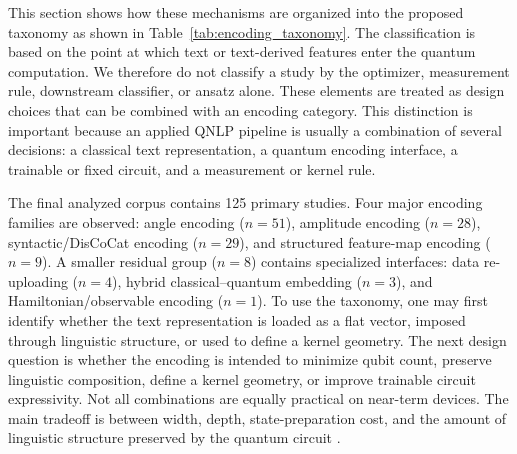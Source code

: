 \documentclass{ieeeaccess}
\begin{document}
This section shows how these mechanisms are organized into the proposed taxonomy as shown in Table~\ref{tab:encoding_taxonomy}. The classification is based on the point at which text or text-derived features enter the quantum computation. We therefore do not classify a study by the optimizer, measurement rule, downstream classifier, or ansatz alone. These elements are treated as design choices that can be combined with an encoding category. This distinction is important because an applied QNLP pipeline is usually a combination of several decisions: a classical text representation, a quantum encoding interface, a trainable or fixed circuit, and a measurement or kernel rule.

The final analyzed corpus contains 125 primary studies. Four major encoding families are observed: angle encoding ($n=51$), amplitude encoding ($n=28$), syntactic/DisCoCat encoding ($n=29$), and structured feature-map encoding ($n=9$). A smaller residual group ($n=8$) contains specialized interfaces: data re-uploading ($n=4$), hybrid classical--quantum embedding ($n=3$), and Hamiltonian/observable encoding ($n=1$). To use the taxonomy, one may first identify whether the text representation is loaded as a flat vector, imposed through linguistic structure, or used to define a kernel geometry. The next design question is whether the encoding is intended to minimize qubit count, preserve linguistic composition, define a kernel geometry, or improve trainable circuit expressivity. Not all combinations are equally practical on near-term devices. The main tradeoff is between width, depth, state-preparation cost, and the amount of linguistic structure preserved by the quantum circuit \cite{preskill2018quantum,cerezo2021variational,ruskanda_evaluating_2025}.
\end{document}
